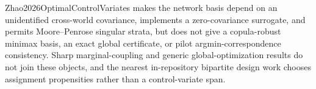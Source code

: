 Zhao2026OptimalControlVariates makes the network basis depend on an unidentified cross-world covariance, implements a zero-covariance surrogate, and permits Moore--Penrose singular strata, but does not give a copula-robust minimax basis, an exact global certificate, or pilot argmin-correspondence consistency.  Sharp marginal-coupling and generic global-optimization results do not join these objects, and the nearest in-repository bipartite design work chooses assignment propensities rather than a control-variate span.